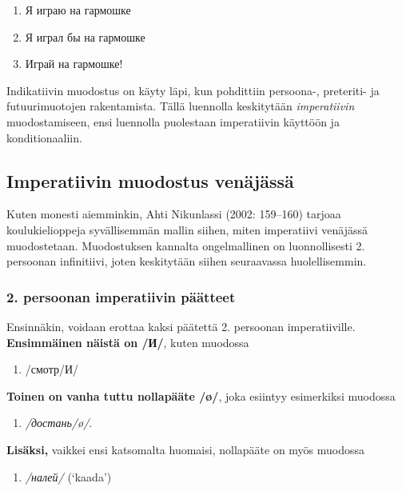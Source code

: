 \documentclass[]{scrartcl}
\providecommand{\tightlist}{%
  \setlength{\itemsep}{0pt}\setlength{\parskip}{0pt}}
\begin{document}
\begin{enumerate}
\def\labelenumi{(\arabic{enumi})}
\tightlist
\item
  Я играю на гармошке
\item
  Я играл бы на гармошке
\item
  Играй на гармошке!
\end{enumerate}

Indikatiivin muodostus on käyty läpi, kun pohdittiin persoona-,
preteriti- ja futuurimuotojen rakentamista. Tällä luennolla keskitytään
\emph{imperatiivin} muodostamiseen, ensi luennolla puolestaan
imperatiivin käyttöön ja konditionaaliin.

\subsection{Imperatiivin muodostus
venäjässä}\label{imperatiivin-muodostus-venuxe4juxe4ssuxe4}

Kuten monesti aiemminkin, Ahti Nikunlassi (2002: 159--160) tarjoaa
koulukielioppeja syvällisemmän mallin siihen, miten imperatiivi
venäjässä muodostetaan. Muodostuksen kannalta ongelmallinen on
luonnollisesti 2. persoonan infinitiivi, joten keskitytään siihen
seuraavassa huolellisemmin.

\subsubsection{2. persoonan imperatiivin
päätteet}\label{persoonan-imperatiivin-puxe4uxe4tteet}

Ensinnäkin, voidaan erottaa kaksi päätettä 2. persoonan imperatiiville.
\textbf{Ensimmäinen näistä on /И/}, kuten muodossa

\begin{enumerate}
\def\labelenumi{(\arabic{enumi})}
\setcounter{enumi}{3}
\tightlist
\item
  /смотр/И/
\end{enumerate}

\textbf{Toinen on vanha tuttu nollapääte /ø/}, joka esiintyy esimerkiksi
muodossa

\begin{enumerate}
\def\labelenumi{(\arabic{enumi})}
\setcounter{enumi}{4}
\tightlist
\item
  \emph{/достань/ø/}.
\end{enumerate}

\textbf{Lisäksi,} vaikkei ensi katsomalta huomaisi, nollapääte on myös
muodossa

\begin{enumerate}
\def\labelenumi{(\arabic{enumi})}
\setcounter{enumi}{5}
\tightlist
\item
  \emph{/налей/} (`kaada')
\end{enumerate}
\end{document}
